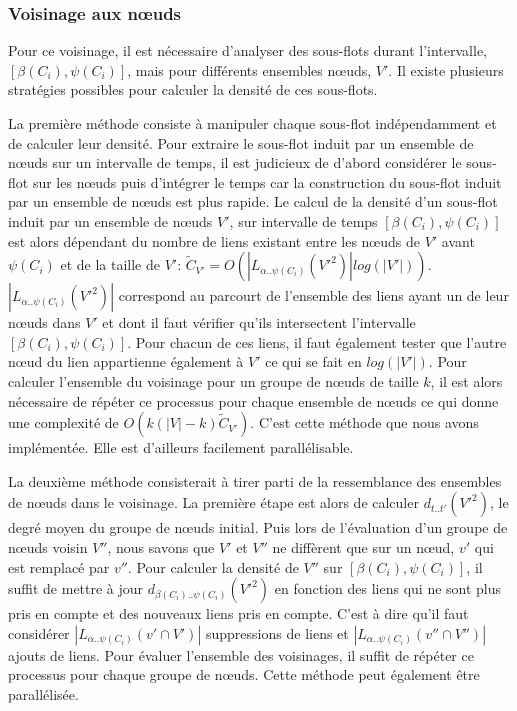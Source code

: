 \subsubsection{Voisinage aux n\oe{}uds}
Pour ce voisinage, il est nécessaire d'analyser des sous-flots durant l'intervalle, $[\beta(C_i),\psi(C_i)]$, mais pour différents ensembles n\oe{}uds, $V'$.
Il existe plusieurs stratégies possibles pour calculer la densité  de ces sous-flots. 

La première méthode consiste à manipuler chaque sous-flot indépendamment et de calculer leur densité.
Pour extraire le sous-flot induit par un ensemble de n\oe{}uds sur un intervalle de temps,
il est judicieux de d'abord considérer le sous-flot sur les n\oe{}uds puis d'intégrer le temps  car la construction du sous-flot induit par un ensemble de n\oe{}uds est plus rapide.
Le calcul de la densité d'un sous-flot induit par un ensemble de n\oe{}uds $V'$, sur intervalle de temps $[\beta(C_i),\psi(C_i)]$ est alors dépendant du nombre de liens existant entre les n\oe{}uds de $V'$ avant $\psi(C_i)$ et de la taille de $V'$: $\tilde{C}_{V'}=O(|L_{\alpha..\psi(C_i)}(V'^2)|log(|V'|))$.
$|L_{\alpha..\psi(C_i)}(V'^2)|$ correspond au parcourt de l'ensemble des liens ayant un de leur n\oe{}uds dans $V'$ et dont il faut vérifier  qu'ils intersectent l'intervalle $[\beta(C_i),\psi(C_i)]$.
Pour chacun de ces liens, il faut également tester que l'autre n\oe{}ud du lien appartienne également à $V'$ ce qui se fait en $log(|V'|)$.
Pour calculer l'ensemble du voisinage pour un groupe de n\oe{}uds de taille $k$, il est alors nécessaire de répéter ce processus pour chaque ensemble de n\oe{}uds ce qui donne une complexité de $O(k(|V|-k) \tilde{C}_{V'})$.
C'est cette méthode que nous avons implémentée.
Elle est d'ailleurs facilement parallélisable.

La deuxième méthode consisterait à tirer parti de la ressemblance des ensembles de n\oe{}uds dans le voisinage.
La première étape est alors de calculer $d_{t..t'}(V'^2)$, le degré moyen du groupe de n\oe{}uds initial.
Puis lors de l'évaluation d'un groupe de n\oe{}uds voisin $V''$, nous savons que $V'$ et $V''$ ne diffèrent que sur un n\oe{}ud, $v'$ qui est remplacé par $v''$.
Pour calculer la densité de $V''$ sur $[\beta(C_i),\psi(C_i)]$, il suffit de mettre à jour $d_{\beta(C_i)..\psi(C_i)}(V'^2)$ en fonction des liens qui ne sont plus pris en compte et des nouveaux liens pris en compte.
C'est à dire qu'il faut considérer $|L_{\alpha..\psi(C_i)}({v'} \cap V')|$ suppressions de liens et  $|L_{\alpha..\psi(C_i)}({v''} \cap V'')|$ ajouts de liens.
Pour évaluer l'ensemble des voisinages, il suffit de répéter ce processus pour chaque groupe de n\oe{}uds.
Cette méthode peut également être parallélisée.



